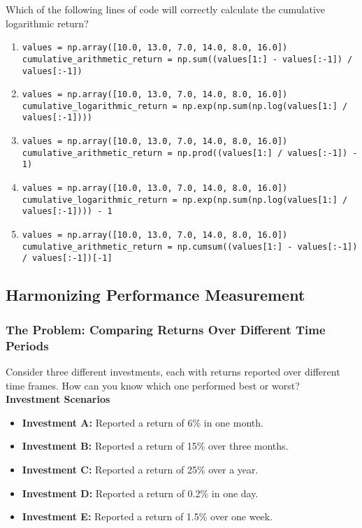 \documentclass{article}
\begin{document}
\begin{enumerate}
    Which of the following lines of code will correctly calculate the cumulative logarithmic return?
    
    \begin{enumerate}
        \item \texttt{values = np.array([10.0, 13.0, 7.0, 14.0, 8.0, 16.0]) \\
        cumulative\_arithmetic\_return = np.sum((values[1:] - values[:-1]) / values[:-1])}
        \item \texttt{values = np.array([10.0, 13.0, 7.0, 14.0, 8.0, 16.0]) \\
        cumulative\_logarithmic\_return = np.exp(np.sum(np.log(values[1:] / values[:-1])))}
        \item \texttt{values = np.array([10.0, 13.0, 7.0, 14.0, 8.0, 16.0]) \\
        cumulative\_arithmetic\_return = np.prod((values[1:] / values[:-1]) - 1)}
        \item \texttt{values = np.array([10.0, 13.0, 7.0, 14.0, 8.0, 16.0]) \\
        cumulative\_logarithmic\_return = np.exp(np.sum(np.log(values[1:] / values[:-1]))) - 1}
        \item \texttt{values = np.array([10.0, 13.0, 7.0, 14.0, 8.0, 16.0]) \\
        cumulative\_arithmetic\_return = np.cumsum((values[1:] - values[:-1]) / values[:-1])[-1]}
    \end{enumerate}

\end{enumerate}



\clearpage

\subsection{Harmonizing Performance Measurement}

\subsubsection{The Problem: Comparing Returns Over Different Time Periods}

Consider three different investments, each with returns reported over different time frames. How can you know which one performed best or worst? \\

\textbf{Investment Scenarios}

\begin{itemize}
    \item \textbf{Investment A:} Reported a return of 6\% in one month.
    \item \textbf{Investment B:} Reported a return of 15\% over three months.
    \item \textbf{Investment C:} Reported a return of 25\% over a year.
    \item \textbf{Investment D:} Reported a return of 0.2\% in one day.
    \item \textbf{Investment E:} Reported a return of 1.5\% over one week.
\end{itemize}
\end{document}
